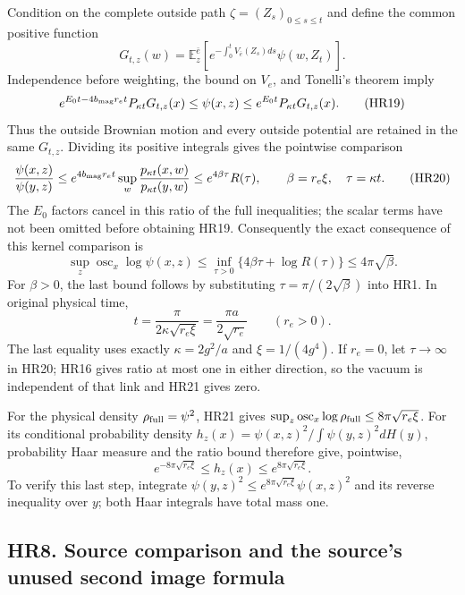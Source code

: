 \documentclass[11pt]{article}
\begin{document}
Condition on the complete outside path \(\zeta=(Z_s)_{0\le s\le t}\)
and define the common positive function
\[
 G_{t,z}(w)=\mathbb E_z^{\bar e}
 \left[e^{-\int_0^tV_{\bar e}(Z_s)ds}\psi(w,Z_t)\right].
\]
Independence before weighting, the bound on \(V_e\), and Tonelli's
theorem imply
\[
 e^{E_0t-4b_{\rm mag}r_et}P_{\kappa t}G_{t,z}(x)
 \le\psi(x,z)\le e^{E_0t}P_{\kappa t}G_{t,z}(x).             \tag{HR19}
\]
Thus the outside Brownian motion and every outside potential are
retained in the same \(G_{t,z}\). Dividing its positive integrals
gives the pointwise comparison
\[
 \frac{\psi(x,z)}{\psi(y,z)}
 \le e^{4b_{\rm mag}r_et}
       \sup_w\frac{p_{\kappa t}(x,w)}{p_{\kappa t}(y,w)}
 \le e^{4\beta\tau}R(\tau),\qquad
 \beta=r_e\xi,\quad \tau=\kappa t.                         \tag{HR20}
\]
The \(E_0\) factors cancel in this ratio of the full inequalities;
the scalar terms have not been omitted before obtaining HR19.
Consequently the exact consequence of this kernel comparison is
\[
 \sup_z\operatorname{osc}_x\log\psi(x,z)
 \le\inf_{\tau>0}\{4\beta\tau+\log R(\tau)\}
 \le4\pi\sqrt\beta.                                       \tag{HR21}
\]
For \(\beta>0\), the last bound follows by substituting
\(\tau=\pi/(2\sqrt\beta)\) into HR1. In original physical time,
\[
 t=\frac{\pi}{2\kappa\sqrt{r_e\xi}}
   =\frac{\pi a}{2\sqrt{r_e}}\qquad(r_e>0).                 \tag{HR22}
\]
The last equality uses exactly \(\kappa=2g^2/a\) and
\(\xi=1/(4g^4)\). If \(r_e=0\), let \(\tau\to\infty\) in
HR20; HR16 gives ratio at most one in either direction, so the
vacuum is independent of that link and HR21 gives zero.

For the physical density \(\rho_{\rm full}=\psi^2\), HR21 gives
\(\sup_z\operatorname{osc}_x\log\rho_{\rm full}\le8\pi\sqrt{r_e\xi}\).
For its conditional probability density
\(h_z(x)=\psi(x,z)^2/\int\psi(y,z)^2dH(y)\), probability Haar
measure and the ratio bound therefore give, pointwise,
\[
 e^{-8\pi\sqrt{r_e\xi}}\le h_z(x)
 \le e^{8\pi\sqrt{r_e\xi}}.                                \tag{HR23}
\]
To verify this last step, integrate
\(\psi(y,z)^2\le e^{8\pi\sqrt{r_e\xi}}\psi(x,z)^2\)
and its reverse inequality over \(y\); both Haar integrals have
total mass one.

\subsection*{HR8. Source comparison and the source's unused second image formula}
\end{document}
